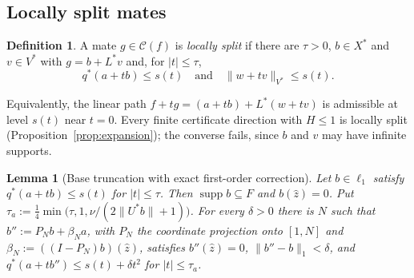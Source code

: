 \documentclass[10pt]{amsart}
\newtheorem{lemma}[theorem]{Lemma}
\theoremstyle{definition}
\newtheorem{definition}[theorem]{Definition}
\theoremstyle{remark}
\newcommand{\supp}{\operatorname{supp}}
\newcommand{\Cset}{\mathcal C}
\newcommand{\zh}{\hat z}
\begin{document}
\subsection{Locally split mates}

\begin{definition}\label{def:locsplit}
A mate $g\in\Cset(f)$ is \emph{locally split} if there are $\tau>0$,
$b\in X^*$ and $v\in V^*$ with $g=b+L^*v$ and, for $|t|\le\tau$,
\[
 q^*(a+tb)\le s(t)\quad\text{and}\quad\|w+tv\|_{V^*}\le s(t).
\]
\end{definition}

Equivalently, the linear path $f+tg=(a+tb)+L^*(w+tv)$ is admissible at
level $s(t)$ near $t=0$.  Every finite certificate direction with $H\le1$
is locally split (Proposition~\ref{prop:expansion}); the converse fails,
since $b$ and $v$ may have infinite supports.

\begin{lemma}[Base truncation with exact first-order correction]\label{lem:basetrunc}
Let $b\in\ell_1$ satisfy $q^*(a+tb)\le s(t)$ for $|t|\le\tau$.  Then
$\supp b\subseteq F$ and $b(\zh)=0$.  Put
$\tau_a:=\frac14\min\big(\tau,1,\nu/(2\|U^*b\|+1)\big)$.  For every
$\delta>0$ there is $N$ such that $b'':=P_Nb+\beta_Na$, with $P_N$ the
coordinate projection onto $[1,N]$ and $\beta_N:=((I-P_N)b)(\zh)$,
satisfies $b''(\zh)=0$, $\|b''-b\|_1<\delta$, and
$q^*(a+tb'')\le s(t)+\delta t^2$ for $|t|\le\tau_a$.
\end{lemma}
\end{document}
